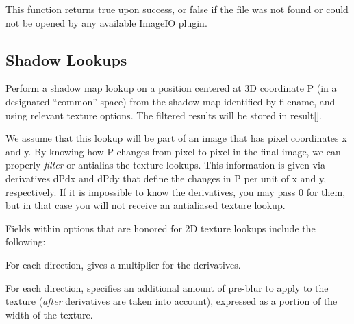 This function returns {\cf true} upon success, or {\cf false} if the
file was not found or could not be opened by any available ImageIO
plugin.
\apiend

\newpage
\subsection{Shadow Lookups}
\label{sec:texturesys:api:shadow}


Perform a shadow map lookup on a position centered at 3D
coordinate {\cf P} (in a designated ``common'' space) from the shadow map identified by
{\cf filename}, and using relevant texture {\cf options}.  The filtered
results will be stored in {\cf result[]}.

We assume that this lookup will be part of an image that has pixel
coordinates {\cf x} and {\cf y}.  By knowing how {\cf P} changes from
pixel to pixel in the final image, we can properly \emph{filter} or
antialias the texture lookups.  This information is given via
derivatives {\cf dPdx} and {\cf dPdy} that define the changes in {\cf P}
per unit of {\cf x} and {\cf y}, respectively.  If it is impossible to
know the derivatives, you may pass 0 for them, but in that case you will
not receive an antialiased texture lookup.

Fields within {\cf options} that are honored for 2D texture lookups
include the following:

\vspace{-12pt}
\vspace{10pt}
For each direction, gives a multiplier for the derivatives.
\apiend

\vspace{-24pt}
\vspace{10pt}
For each direction, specifies an additional amount of pre-blur to apply
to the texture (\emph{after} derivatives are taken into account),
expressed as a portion of the width of the texture.
\apiend

